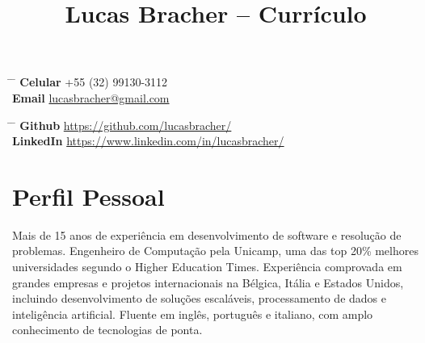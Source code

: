 \documentclass[10pt]{article} %
\begin{document}

\title{Lucas Bracher -- Currículo} %


\parbox{0.5\textwidth}{ %
\begin{tabbing} %
\hspace{3cm} \= \hspace{4cm} \= \kill %
{\bf Celular} \> +55 (32) 99130-3112 \\ %
{\bf Email} \> \href{mailto:lucasbracher@gmail.com}{lucasbracher@gmail.com} \\ %
\end{tabbing}}
\hfill %
\parbox{0.5\textwidth}{ %
\begin{tabbing} %
\hspace{3cm} \= \hspace{4cm} \= \kill %
{\bf Github} \> \href{https://github.com/lucasbracher/}{https://github.com/lucasbracher/} \\ %
{\bf LinkedIn} \> \href{https://www.linkedin.com/in/lucasbracher/}{https://www.linkedin.com/in/lucasbracher/} \\ %
\end{tabbing}}


\section{Perfil Pessoal}

Mais de 15 anos de experiência em desenvolvimento de software e resolução de problemas. Engenheiro de Computação pela Unicamp, uma das top 20\% melhores universidades segundo o Higher Education Times. Experiência comprovada em grandes empresas e projetos internacionais na Bélgica, Itália e Estados Unidos, incluindo desenvolvimento de soluções escaláveis, processamento de dados e inteligência artificial. Fluente em inglês, português e italiano, com amplo conhecimento de tecnologias de ponta.
\end{document}
